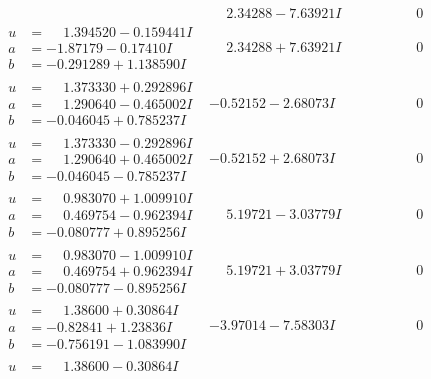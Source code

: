\documentclass[1p]{elsarticle_modified}
\theoremstyle{definition}
\begin{document}
$$\begin{array}{c|c|c}
 & \phantom{-}2.34288 - 7.63921 I & \phantom{-0.000000 } 0 \\ \hline\begin{aligned}
u &= \phantom{-}1.394520 - 0.159441 I \\
a &= -1.87179 - 0.17410 I \\
b &= -0.291289 + 1.138590 I\end{aligned}
 & \phantom{-}2.34288 + 7.63921 I & \phantom{-0.000000 } 0 \\ \hline\begin{aligned}
u &= \phantom{-}1.373330 + 0.292896 I \\
a &= \phantom{-}1.290640 - 0.465002 I \\
b &= -0.046045 + 0.785237 I\end{aligned}
 & -0.52152 - 2.68073 I & \phantom{-0.000000 } 0 \\ \hline\begin{aligned}
u &= \phantom{-}1.373330 - 0.292896 I \\
a &= \phantom{-}1.290640 + 0.465002 I \\
b &= -0.046045 - 0.785237 I\end{aligned}
 & -0.52152 + 2.68073 I & \phantom{-0.000000 } 0 \\ \hline\begin{aligned}
u &= \phantom{-}0.983070 + 1.009910 I \\
a &= \phantom{-}0.469754 - 0.962394 I \\
b &= -0.080777 + 0.895256 I\end{aligned}
 & \phantom{-}5.19721 - 3.03779 I & \phantom{-0.000000 } 0 \\ \hline\begin{aligned}
u &= \phantom{-}0.983070 - 1.009910 I \\
a &= \phantom{-}0.469754 + 0.962394 I \\
b &= -0.080777 - 0.895256 I\end{aligned}
 & \phantom{-}5.19721 + 3.03779 I & \phantom{-0.000000 } 0 \\ \hline\begin{aligned}
u &= \phantom{-}1.38600 + 0.30864 I \\
a &= -0.82841 + 1.23836 I \\
b &= -0.756191 - 1.083990 I\end{aligned}
 & -3.97014 - 7.58303 I & \phantom{-0.000000 } 0 \\ \hline\begin{aligned}
u &= \phantom{-}1.38600 - 0.30864 I \\

\end{aligned}
\end{array}$$
\end{document}
